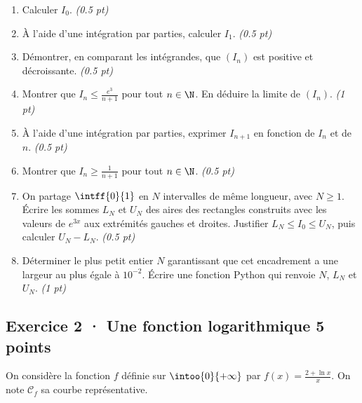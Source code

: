 \begin{enumerate}

\item Calculer $I_0$. \hfill\textit{(\num{0,5} pt)}

\item À l'aide d'une intégration par parties, calculer $I_1$. \hfill\textit{(\num{0,5} pt)}

\item Démontrer, en comparant les intégrandes, que $(I_n)$ est positive et décroissante. \hfill\textit{(\num{0,5} pt)}

\item Montrer que $I_n\le\frac{e^{3}}{n+1}$ pour tout $n\in\N$. En déduire la limite de $(I_n)$. \hfill\textit{(1 pt)}

\item À l'aide d'une intégration par parties, exprimer $I_{n+1}$ en fonction de $I_n$ et de $n$. \hfill\textit{(\num{0,5} pt)}

\item Montrer que $I_n\ge\frac1{n+1}$ pour tout $n\in\N$. \hfill\textit{(\num{0,5} pt)}

\item On partage $\intff{0}{1}$ en $N$ intervalles de même longueur, avec $N\ge1$. Écrire les sommes $L_N$ et $U_N$ des aires des rectangles construits avec les valeurs de $e^{3x}$ aux extrémités gauches et droites. Justifier $L_N\le I_0\le U_N$, puis calculer $U_N-L_N$. \hfill\textit{(\num{0,5} pt)}

\item Déterminer le plus petit entier $N$ garantissant que cet encadrement a une largeur au plus égale à $10^{-2}$. Écrire une fonction Python qui renvoie $N$, $L_N$ et $U_N$. \hfill\textit{(1 pt)}

\end{enumerate}

\subsection*{Exercice 2 · Une fonction logarithmique \hfill 5 points}On considère la fonction $f$ définie sur $\intoo{0}{+\infty}$ par $f(x)=\frac{2+\ln x}x$. On note $\mathcal C_f$ sa courbe représentative.

